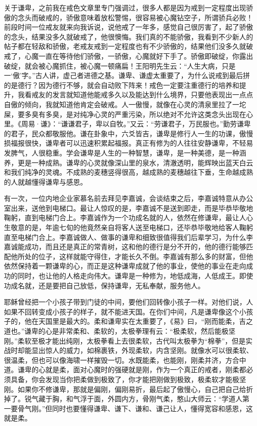关于谦卑，之前我在戒色文章里专门强调过，很多人都是因为戒到一定程度出现骄傲的念头而破戒的，骄傲意味着放松警惕，很容易被心魔钻空子，所谓骄兵必败！前段时间一位戒友就来向我诉说，说他戒了一年多，感觉自己很厉害了，起了骄傲的念头，结果没多久就破戒了，他很懊悔。我们真的不能骄傲，我看到不少新人的帖子都在轻敌和骄傲，老戒友戒到一定程度也有不少骄傲的，结果他们没多久就破戒了，心魔一直在等待他们骄傲，一骄傲，心魔就好下手了。骄傲即破绽，你露出破绽，就会被心魔抓住，被心魔一顿痛扁！王阳明先生云：“人生大病，只是一‘傲’字。”古人讲，虚己者进德之基。谦卑、谦虚太重要了，为什么说戒到最后拼的是德行？因为德行不够，就会自动败下阵来！戒色一定要注重德行的培养和提升，我看戒友的发言就知道他能戒多久以及能达到什么境界，只要他表现出一点点自傲的倾向，我就知道他肯定会破戒。人一傲慢，就像在心灵的清泉里拉了一坨屎，要多臭有多臭，是对纯净心灵的严重污染，所以绝对不允许这类念头出现在心里。《周易·谦》：“谦谦君子，卑以自牧。”又云：“劳谦君子，万民服也。”勤劳谦卑的君子，民众都敬服他。谦在卦象中，六爻皆吉，谦卑是修行人一生的功课，傲慢损福报很快，谦卑者可以迅速积累起福报。真正有修为的人往往安静谦卑，不轻易发脾气，人很稳重。学会谦卑是人生的一种智慧，谦卑，是一种美德，是一种涵养，更是一种成熟。谦卑的心灵就像深山里的泉水，清澈透明，能辉映出蓝天白云和我们纯净的灵魂。不成熟的麦穗竖得很高，越成熟的麦穗越往下垂，生命越成熟的人就越懂得谦卑与感恩。

有一次，一位内地企业家慕名前去拜见李嘉诚，会谈结束之后，李嘉诚特意从办公室出来，送他到电梯口。最让人惊叹的是，李嘉诚不是送到即走，而是毕恭毕敬地鞠躬，直到电梯门合上。李嘉诚作为一个功成名就的人，依然在修谦卑，最让人心生敬意的是，年逾七旬的他竟然亲自将客人送至电梯口，还毕恭毕敬地给客人鞠躬直至电梯门合上。李嘉诚做人、做事的谦卑和细致很值得我们后辈学习，为什么李嘉诚能成功，而且还是真正的常青树，这和他的德行是分不开的，他的德行能够匹配他所处的位子，这样就能守得住，才能长久不倒。李嘉诚有那么多的财富，但他依然保持着一颗谦卑的心，而正是这种谦卑成就了他的事业，使他的事业在走向成功的同时，也让他的人格走向伟大。谦卑是一种修为，地低成海，人低成王。即使功成名就，还是要把自己放低，保持谦卑，无私奉献，服务他人。

耶稣曾经把一个小孩子带到门徒的中间，要他们回转像小孩子一样。对他们说，人如果不回转变成小孩子的样子，就不能进天国。在你们中间，凡是谦卑像这个小孩子的，他在天国里是最大的。柔和谦卑实在太重要了，《易》曰，“刚而能柔，吉之道也。”谦卑的心是非常柔和、柔软的，太极拳理有云：“极柔软，然后能极坚刚。”柔软至极才能出纯刚，太极拳看上去很柔软，古代叫太极拳为“棉拳”，但是实战时却能显出惊人的威力，如棉裹铁，外现柔软，内含坚刚。就像水可以很柔软、很温柔，但也可以像海啸一样摧毁一切。水既能柔，也能刚，刚柔并济，方合中道。谦卑的心就是柔，面对心魔时的强硬就是刚，作为一个真正的戒者，刚柔都必须具备，你会发现当你把柔做到极致了，你才能把刚做到极致，极柔软才能极坚刚。如果你不修谦卑，那就是偏刚，偏刚易折，最后起了傲慢心，自己把自己给折掉了。锐气藏于胸，和气浮于面，外圆内方，骨刚气柔，憨山大师云：“学道人第一要骨气刚。”但同时也要懂得谦卑、谦下、谦和、谦己让人，懂得宽容和感恩，这就是柔。


